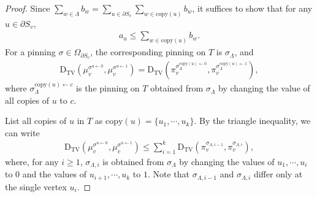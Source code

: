 \documentclass[11pt]{amsart}
\def\-#1{\mathrm{#1}}
\newcommand{\DTV}[2]{\-D_{\mathrm{TV}}\left({#1},{#2}\right)}
\theoremstyle{definition}
\theoremstyle{remark}
\begin{document}
\begin{proof}
Since $\sum_{w \in \Lambda} b_w=\sum_{u \in \partial S_v} \sum_{w\in \text{copy}(u)}b_w$, it suffices to show that for any $u \in \partial S_v$,
\begin{align}\label{eq:need-to-show-mapping}
    a_u \leq \sum_{w\in \text{copy}(u)}b_w. 
\end{align}
For a pinning $\sigma \in \Omega_{\partial S_v}$, the corresponding pinning on $T$ is $\sigma_\Lambda$, and
\begin{align*}
   \DTV{\mu^{\sigma^{u \gets 0}}_v}{\mu^{\sigma^{u \gets 1}}_v} = \DTV{\pi^{\sigma_{\Lambda}^{\text{copy}(u) \gets 0}}_v}{\pi^{\sigma_{\Lambda}^{\text{copy}(u) \gets 1}}_v},
\end{align*}
where $\sigma_{\Lambda}^{\text{copy}(u) \gets c}$ is the pinning on $T$ obtained from $\sigma_\Lambda$ by changing the value of all copies of $u$ to $c$.

List all copies of $u$ in $T$ as $\text{copy}(u) = \{u_1,\cdots,u_k\}$. By the triangle inequality, we can write 
\begin{align}\label{eq:triangle-split}
  \DTV{\mu^{\sigma^{u \gets 0}}_v}{\mu^{\sigma^{u \gets 1}}_v} \leq \sum_{i=1}^k \DTV{\pi^{\sigma_{\Lambda,i-1}}_v}{\pi^{\sigma_{\Lambda,i}}_v},
\end{align}
where, for any $i\ge 1$, $\sigma_{\Lambda,i}$ is obtained from $\sigma_\Lambda$ by changing the values of $u_1,\cdots,u_{i}$ to $0$ and the values of $u_{i+1},\cdots,u_k$ to $1$.
Note that $\sigma_{\Lambda,i-1}$ and $\sigma_{\Lambda,i}$ differ only at the single vertex $u_i$.


\end{proof}
\end{document}
